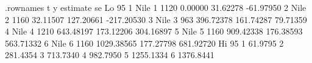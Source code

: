 \begin{Schunk}
\begin{Soutput}
  .rownames t    y   estimate        se      Lo 95
1      Nile 1 1120    0.00000  31.62278  -61.97950
2      Nile 2 1160   32.11507 127.20661 -217.20530
3      Nile 3  963  396.72378 161.74287   79.71359
4      Nile 4 1210  643.48197 173.12206  304.16897
5      Nile 5 1160  909.42338 176.38593  563.71332
6      Nile 6 1160 1029.38565 177.27798  681.92720
      Hi 95
1   61.9795
2  281.4354
3  713.7340
4  982.7950
5 1255.1334
6 1376.8441
\end{Soutput}
\end{Schunk}
